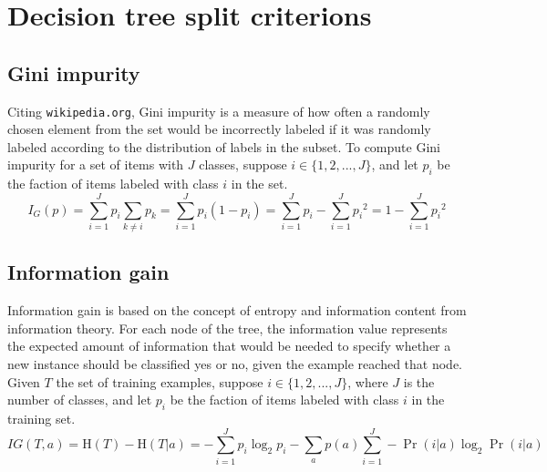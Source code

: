 \documentclass[11pt, a4paper]{article}
\begin{document}
\section{Decision tree split criterions}
  \label{appendix:splitcriterions}
  \subsection{Gini impurity}
    Citing \texttt{wikipedia.org}, Gini impurity is a measure of how often a randomly chosen element from the set would be incorrectly labeled if it was randomly labeled according to the distribution of labels in the subset.
    To compute Gini impurity for a set of items with $J$ classes, suppose $i\in\{1,2,...,J\}$, and let $p_{i}$ be the faction of items labeled with class $i$ in the set.
    \[{I} _{G}(p)=\sum _{i=1}^{J}p_{i}\sum _{k\neq i}p_{k}=\sum _{i=1}^{J}p_{i}(1-p_{i})=\sum _{i=1}^{J}p_{i}-\sum _{i=1}^{J}{p_{i}}^{2}=1-\sum _{i=1}^{J}{p_{i}}^{2}\]
  \subsection{Information gain}
    Information gain is based on the concept of entropy and information content from information theory.
    For each node of the tree, the information value represents the expected amount of information that would be needed to specify whether a new instance should be classified yes or no, given the example reached that node.
    Given $T$ the set of training examples, suppose $i\in\{1,2,...,J\}$, where $J$ is the number of classes, and let $p_{i}$ be the faction of items labeled with class $i$ in the training set.
    \[IG(T, a)=\mathrm{H}(T)-\mathrm{H}(T|a)=-\sum _{i=1}^{J}p_{i}\log _{2}{p_{i}}-\sum _{a}{p(a)\sum _{i=1}^{J}-\Pr(i|a)\log _{2}{\Pr(i|a)}}\]



\end{document}
